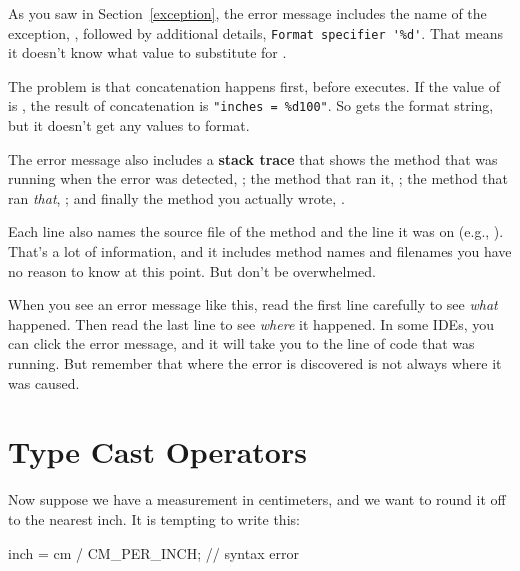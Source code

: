 As you saw in Section~\ref{exception}, the error message includes the name of the exception, , followed by additional details, \verb"Format specifier '%d'".
That means it doesn't know what value to substitute for .


The problem is that concatenation happens first, before  executes.
If the value of  is , the result of concatenation is \verb'"inches = %d100"'.
So  gets the format string, but it doesn't get any values to format.


The error message also includes a {\bf stack trace} that shows the method that was running when the error was detected, ; the method that ran it, ; the method that ran {\em that}, ; and finally the method you actually wrote, .

Each line also names the source file of the method and the line it was on (e.g., ).
That's a lot of information, and it includes method names and filenames you have no reason to know at this point.
But don't be overwhelmed.

When you see an error message like this, read the first line carefully to see {\em what} happened.
Then read the last line to see {\em where} it happened.
In some IDEs, you can click the error message, and it will take you to the line of code that was running.
But remember that where the error is discovered is not always where it was caused.


\section{Type Cast Operators}

Now suppose we have a measurement in centimeters, and we want to round it off to the nearest inch.
It is tempting to write this:

\begin{code}
inch = cm / CM_PER_INCH;  // syntax error
\end{code}

